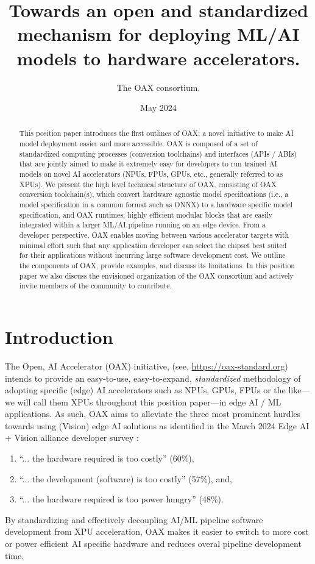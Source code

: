 \documentclass{article}
\newcommand{\oaxweb}{\href{https://oax-standard.org}{https://oax-standard.org}}
\begin{document}
\title{Towards an open and standardized mechanism for deploying ML/AI models to hardware accelerators.}
\author{The OAX consortium.}
\date{May 2024}
\maketitle

\begin{abstract}
This position paper introduces the first outlines of OAX; a novel initiative to make AI model deployment easier and more accessible. OAX is composed of a set of standardized computing processes (conversion toolchains) and interfaces (APIs / ABIs) that are jointly aimed to make it extremely easy for developers to run trained AI models on novel AI accelerators  (NPUs, FPUs, GPUs, etc., generally referred to as XPUs). We present the high level technical structure of OAX, consisting of OAX conversion toolchain(s), which convert hardware agnostic model specifications (i.e., a model specification in a common format such as ONNX) to a hardware specific model specification, and OAX runtimes; highly efficient modular blocks that are easily integrated within a larger ML/AI pipeline running on an edge device. From a developer perspective, OAX enables moving between various accelerator targets with minimal effort such that any application developer can select the chipset best suited for their applications without incurring large software development cost. We outline the components of OAX, provide examples, and discuss its limitations. In this position paper we also discuss the envisioned organization of the OAX consortium and actively invite members of the community to contribute.
\end{abstract}

\tableofcontents

\section{Introduction}

The Open, AI Accelerator (OAX) initiative,  (see, \oaxweb) intends to provide an easy-to-use, easy-to-expand, \emph{standardized} methodology of adopting specific (edge) AI accelerators such as NPUs, GPUs, FPUs or the like---we will call them XPUs throughout this position paper---in edge AI / ML applications. As such, OAX aims to alleviate the three most prominent hurdles towards using (Vision) edge AI solutions as identified in the March 2024 Edge AI + Vision alliance developer survey \cite{EVS}: 
\begin{enumerate}
\item ``... the hardware required is too costly'' (60\%), 
\item ``... the development (software) is too costly'' (57\%), and, 
\item ``... the hardware required is too power hungry'' (48\%). 
\end{enumerate}
By standardizing and effectively decoupling AI/ML pipeline software development from XPU acceleration, OAX makes it easier to switch to more cost or power efficient AI specific hardware and reduces overal pipeline development time. 
\end{document}
